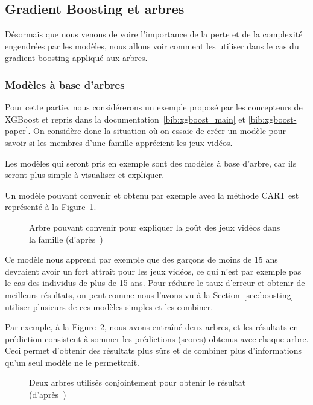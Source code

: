 \subsection{Gradient Boosting et arbres}
\label{sec:gradient-boosting}

Désormais que nous venons de voire l'importance de la perte et de la complexité engendrées par les modèles, nous allons voir comment les utiliser dans le cas du gradient boosting appliqué aux arbres.

\subsubsection{Modèles à base d'arbres}
Pour cette partie, nous considérerons un exemple proposé par les concepteurs de XGBoost et repris dans la documentation~\ref{bib:xgboost_main} et \ref{bib:xgboost-paper}. On considère donc la situation où on essaie de créer un modèle pour savoir si les membres d'une famille apprécient les jeux vidéos.

Les modèles qui seront pris en exemple sont des modèles à base d'arbre, car ils seront plus simple à visualiser et expliquer.

Un modèle pouvant convenir et obtenu par exemple avec la méthode CART est représenté à la Figure~\ref{fig:arbre}.

\begin{figure}[h]
	\begin{margincap}
	  \centering
	  
	  \caption{Arbre pouvant convenir pour expliquer la goût des jeux vidéos dans la famille (d'après~\cite{bib:xgboost_paper})}
	  \label{fig:arbre}
	\end{margincap}
\end{figure}

Ce modèle nous apprend par exemple que des garçons de moins de 15 ans devraient avoir un fort attrait pour les jeux vidéos, ce qui n'est par exemple pas le cas des individus de plus de 15 ans. Pour réduire le taux d'erreur et obtenir de meilleurs résultats, on peut comme nous l'avons vu à la Section~\ref{sec:boosting} utiliser plusieurs de ces modèles simples et les combiner.

Par exemple, à la Figure~\ref{fig:arbres}, nous avons entraîné deux arbres, et les résultats en prédiction consistent à sommer les prédictions (scores) obtenus avec chaque arbre. Ceci permet d'obtenir des résultats plus sûrs et de combiner plus d'informations qu'un seul modèle ne le permettrait.

\begin{figure}[h]
	\begin{margincap}
	  \centering
	  \resizebox{.48\textwidth}{!}{}\hfill\resizebox{.48\textwidth}{!}{}
	  \caption{Deux arbres utilisés conjointement pour obtenir le résultat (d'après~\cite{bib:xgboost_paper})}
	  \label{fig:arbres}
	\end{margincap}
\end{figure}

